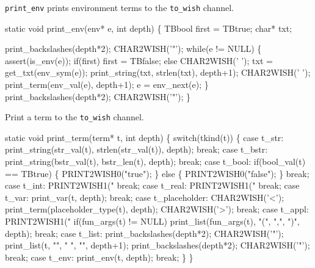 
{\tt print_env} prints environment terms to the {\tt to\_wish} channel.

\nwenddocs{}\endmoddef\let\nwnotused=\nwoutput{}\nwstartdeflinemarkup{}\nwenddeflinemarkup
static void print_env(env* e, int depth)
\{
   TBbool first = TBtrue;
   char* txt;
   
   print_backslashes(depth*2);
   CHAR2WISH('"');
   while(e != NULL)
   \{
      assert(is_env(e));
      if(first)
        first = TBfalse;
      else
        CHAR2WISH(' ');
      txt = get_txt(env_sym(e));
      print_string(txt, strlen(txt), depth+1);
      CHAR2WISH(' ');
      print_term(env_val(e), depth+1);
      e = env_next(e);
   \}
   print_backslashes(depth*2);
   CHAR2WISH('"');
\}
\nwendcode{}\nwdocspar



Print a term to the {\tt to\_wish} channel.

\nwenddocs{}\endmoddef\let\nwnotused=\nwoutput{}\nwstartdeflinemarkup{}\nwenddeflinemarkup
static void print_term(term* t, int depth)
\{
   switch(tkind(t))
   \{
      case t_str:
         print_string(str_val(t), strlen(str_val(t)), depth);
         break;
      case t_bstr:
         print_string(bstr_val(t), bstr_len(t), depth);
         break;
      case t_bool:
         if(bool_val(t) == TBtrue) \{
            PRINT2WISH0("true");
         \} else \{
            PRINT2WISH0("false");
         \}
         break;
      case t_int:
         PRINT2WISH1("%
         break;
      case t_real:
         PRINT2WISH1("%
         break;
      case t_var:
         print_var(t, depth);
         break;
      case t_placeholder:
         CHAR2WISH('<');
         print_term(placeholder_type(t), depth);
         CHAR2WISH('>');
         break;
      case t_appl:
         PRINT2WISH1("%
         if(fun_args(t) != NULL)
            print_list(fun_args(t), "(", ",", ")", depth);
         break;
      case t_list:
         print_backslashes(depth*2);
         CHAR2WISH('"');
         print_list(t, "", " ", "", depth+1);   
         print_backslashes(depth*2);
         CHAR2WISH('"');
         break;
      case t_env:
         print_env(t, depth);
         break;
   \}
\}
\nwendcode{}\nwdocspar

